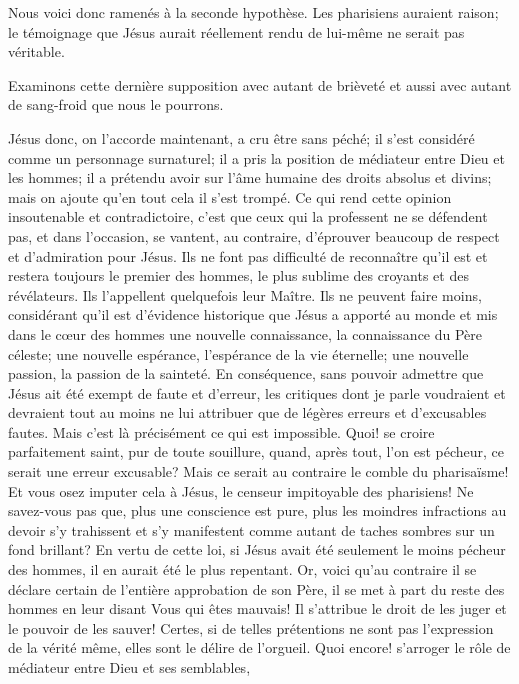 Nous voici donc ramenés à la seconde hypothèse. Les pharisiens auraient raison; le témoignage que Jésus aurait réellement rendu
de lui-même ne serait pas véritable.

Examinons cette dernière supposition avec autant de brièveté et aussi avec autant de sang-froid que nous le pourrons.

Jésus donc, on l’accorde maintenant, a cru être sans péché;
il s’est considéré comme un personnage surnaturel;
il a pris la position de médiateur entre Dieu et les hommes;
il a prétendu avoir sur l’âme humaine des droits absolus et divins;
mais on ajoute qu’en tout cela il s’est trompé. \ocadr Ce qui rend cette opinion insoutenable et contradictoire,
c’est que ceux qui la professent ne se défendent pas, et dans l’occasion, se vantent,
au contraire, d’éprouver beaucoup de respect et d’admiration pour Jésus.
Ils ne font pas difficulté de reconnaître qu’il est et restera toujours le premier des hommes,
le plus sublime des croyants et des révélateurs.
Ils l’appellent quelquefois leur Maître. Ils ne peuvent faire moins, considérant qu’il est d’évidence historique que Jésus
a apporté au monde et mis dans le cœur des hommes une nouvelle connaissance,
la connaissance du Père céleste; une nouvelle espérance, l’espérance de la vie éternelle;
une nouvelle passion, la passion de la sainteté.
En conséquence, sans pouvoir admettre que Jésus ait été exempt de faute et d’erreur, les critiques dont je parle
voudraient et devraient tout au moins ne lui attribuer que de légères erreurs et d’excusables fautes.
Mais c’est là précisément ce qui est impossible. Quoi! se croire parfaitement saint, pur de toute souillure, quand,
après tout, l’on est pécheur, ce serait une erreur excusable?
Mais ce serait au contraire le comble du pharisaïsme!
Et vous osez imputer cela à Jésus, le censeur impitoyable des pharisiens!
Ne savez-vous pas que, plus une conscience est pure, plus les moindres infractions au devoir
s’y trahissent et s’y manifestent comme autant de taches sombres sur un fond brillant?
En vertu de cette loi, si Jésus avait été seulement le moins pécheur des hommes,
il en aurait été le plus repentant.
Or, voici qu’au contraire il se déclare certain de l’entière approbation de son Père,
il se met à part du reste des hommes en leur disant\frcolon{}
\Og{} Vous qui êtes mauvais!\Fg{}
Il s’attribue le droit de les juger et le pouvoir de les sauver!
Certes, si de telles prétentions ne sont pas l’expression de la vérité même,
elles sont le délire de l’orgueil. \ocadr Quoi encore! s’arroger le rôle de médiateur entre Dieu et ses semblables,
